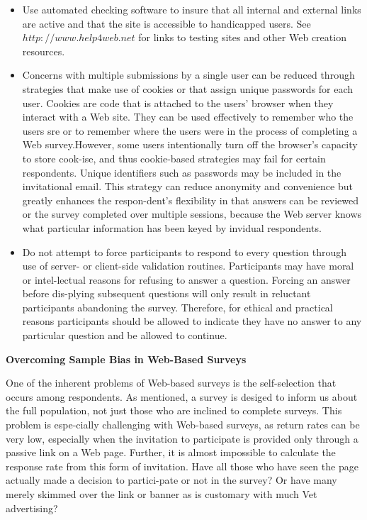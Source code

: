 \documentclass{article}
\begin{document}
\vspace*{0.5cm}
\begin{itemize}
  \item Use automated checking software to insure that all internal and external links are active and that the site is accessible to handicapped users. See $http://www.help4web.net$ for links to testing sites and other Web creation resources.\\
  \item Concerns with multiple submissions by a single user can be reduced through strategies that make use of cookies or that assign unique passwords for each user. Cookies are code that is attached to the users' browser when they interact with a Web site. They can be used effectively to remember who the users sre or to remember where the users were in the process of completing a Web survey.However, some users intentionally turn off the browser's capacity to store cook-ise, and thus cookie-based strategies may fail for certain respondents. Unique identifiers such as passwords may be included in the invitational email. This strategy can reduce anonymity and convenience but greatly enhances the respon-dent's flexibility in that answers can be reviewed or the survey completed over multiple sessions, because the Web server knows what particular information has been keyed by invidual respondents.\\
\end{itemize}

\begin{itemize}
  \item Do not attempt to force participants to respond to every question through use of server- or client-side validation routines. Participants may have moral or intel-lectual reasons for refusing to answer a question. Forcing an answer before dis-plying    subsequent   questions  will  only  result  in  reluctant  participants abandoning the survey. Therefore, for ethical and practical reasons participants should be allowed to indicate they have no answer to any particular question and be allowed to continue.\\
\end{itemize}

\vspace*{0.5cm}
\large{
\textbf{Overcoming Sample Bias in Web-Based Surveys}\\
}

\vspace*{0.1cm}
One of the inherent problems of Web-based surveys is the self-selection that occurs among respondents. As mentioned, a survey is desiged to inform us about the full population, not just those who are inclined to complete surveys. This problem is espe-cially challenging with Web-based surveys, as return rates can be very low, especially when the invitation to participate is provided only through a passive link on a Web page.
Further, it is almost impossible to calculate the response rate from this form of invitation. Have all those who have seen the page actually made a decision to partici-pate or not in the survey? Or have many merely skimmed over the link or banner as is customary with much Vet advertising?\\
\end{document}
